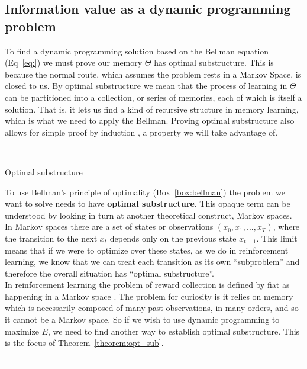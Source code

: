 	

\subsection*{Information value as a dynamic programming problem} To find a dynamic programming solution based on the Bellman equation (Eq~\ref{eq:}) we must prove our memory $\Theta$ has optimal substructure. This is because the normal route, which assumes the problem rests in a Markov Space, is closed to us. By optimal substructure we mean that the process of learning in $\Theta$ can be partitioned into a collection, or series of memories, each of which is itself a solution. That is, it lets us find a kind of recursive structure in memory learning, which is what we need to apply the Bellman. Proving optimal substructure also allows for simple proof by induction \citep{Roughgarden2019}, a property we will take advantage of. 

-------------------------------------------------------------------------
\begin{featurebox}
	\caption{Optimal substructure}
	\label{box:substructure}
	To use Bellman's principle of optimality (Box~\ref{box:bellman}) the problem we want to solve needs to have \textbf{optimal substructure}. This opaque term can be understood by looking in turn at another theoretical construct, Markov spaces. 
	\\
	In Markov spaces there are a set of states or observations $(x_0, x_1, ..., x_{T})$, where the transition to the next $x_t$ depends only on the previous state $x_{t-1}$. This limit means that if we were to optimize over these states, as we do in reinforcement learning, we know that we can treat each transition as its own ``subproblem'' and therefore the overall situation has ``optimal substructure''.
	\\
	In reinforcement learning the problem of reward collection is defined by fiat as happening in a Markov space \citep{Sutton2018}. The problem for curiosity is it relies on memory which is necessarily composed of many past observations, in many orders, and so it cannot be a Markov space. So if we wish to use dynamic programming to maximize $E$, we need to find another way to establish optimal substructure. This is the focus of Theorem~\ref{theorem:opt_sub}.
	\medskip
\end{featurebox}
-------------------------------------------------------------------------

